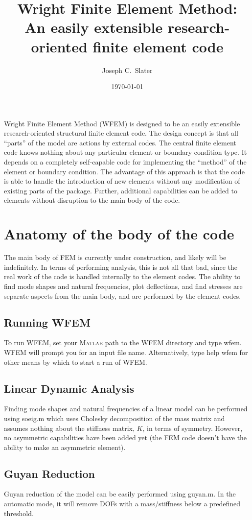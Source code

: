 \documentclass[12pt]{article}
\title{Wright Finite Element Method:\\
  \small{An easily extensible research-oriented finite element code}}
\author{Joseph C.~Slater} \date{\today}
\newcommand*{\command}[1]{\textsf{#1}}
\begin{document}
\lstset{language=Matlab,numbers=left,numberstyle=\tiny,keywordstyle=\bfseries,escapechar=!}
\maketitle
\newpage
\tableofcontents
\newpage
Wright Finite Element Method (WFEM) is designed to be an
easily extensible research-oriented structural finite element code.
The design concept is that all ``parts'' of the model are actions by
external codes. The central finite element code knows nothing about
any particular element or boundary condition type. It depends on a
completely self-capable code for implementing the ``method'' of the
element or boundary condition. The advantage of this approach is that
the code is able to handle the introduction of new elements without
any modification of existing parts of the package. Further, additional
capabilities can be added to elements without disruption to the main
body of the code.

\section{Anatomy of the body of the code}
The main body of FEM is currently under construction, and likely will
be indefinitely. In terms of performing analysis, this is not all that
bad, since the real work of the code is handled internally to the
element codes. The ability to find mode shapes and natural
frequencies, plot deflections, and find stresses are separate aspects
from the main body, and are performed by the element codes.
\subsection{Running WFEM}
To run WFEM, set your M\textsc{atlab}{}{} path to the WFEM directory and type \command{wfem}. WFEM will prompt you for an input file name. Alternatively, type \command{help wfem} for other means by which to start a run of WFEM.
\subsection{Linear Dynamic Analysis}
Finding mode shapes and natural frequencies of a linear model can be
performed using \textsf{soeig.m} which uses Cholesky decomposition
of the mass matrix and assumes nothing about the stiffness matrix,
$K$, in terms of symmetry. However, no asymmetric capabilities have
been added yet (the FEM code doesn't have the ability to make an
asymmetric element).
\subsection{Guyan Reduction}
Guyan reduction of the model can be easily performed using
\textsf{guyan.m}. In the automatic mode, it will remove DOFs with a
mass/stiffness below a predefined threshold.
\end{document}
